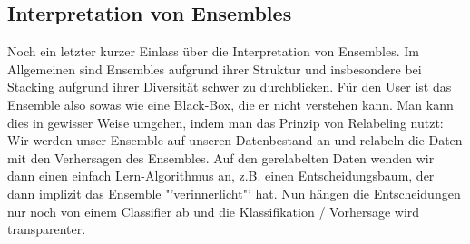 \subsection{Interpretation von Ensembles}
Noch ein letzter kurzer Einlass über die Interpretation von Ensembles.
Im Allgemeinen sind Ensembles aufgrund ihrer Struktur und insbesondere bei
Stacking aufgrund ihrer Diversität schwer zu durchblicken. Für den User
ist das Ensemble also sowas wie eine Black-Box, die er nicht verstehen kann.
Man kann dies in gewisser Weise umgehen, indem man das Prinzip von 
Relabeling nutzt: Wir werden unser Ensemble auf unseren Datenbestand an
und relabeln die Daten mit den Verhersagen des Ensembles. Auf den gerelabelten
Daten wenden wir dann einen einfach Lern-Algorithmus an, z.B. einen
Entscheidungsbaum, der dann implizit das Ensemble "'verinnerlicht"' hat. Nun
hängen die Entscheidungen nur noch von einem Classifier ab und die
Klassifikation / Vorhersage wird transparenter.